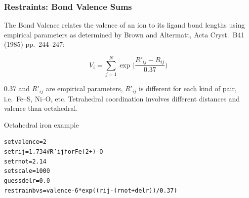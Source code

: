 \documentclass[10pt, xcolor=x11names, compress]{beamer}
\begin{document}
\begin{frame}[fragile]
  \frametitle{Restraints: Bond Valence Sums}

  The Bond Valence relates the valence of an ion to its ligand bond
  lengths using empirical parameters as determined by Brown and
  Altermatt, Acta Cryst.\ B41 (1985) pp.~244--247:

  \begin{equation}
    \label{eq:bvs}
    V_i = \sum\limits_{j=1}^N \exp\Big(\frac{R'_{ij} - R_{ij}}{0.37}\Big)
  \end{equation}

  0.37 and $R'_{ij}$ are empirical parameters, $R'_{ij}$ is
  different for each kind of pair, i.e.\ Fe--S, Ni--O, etc.
  Tetrahedral coordination involves different distances and valence
  than octahedral.

  \bigskip

  Octahedral iron example
  \begin{block}{}
    \begin{alltt}
    \scriptsize
     {\color{setp}set}      valence = 2
     {\color{setp}set}      rij     = 1.734  {\color{Blue4}# R'ij for Fe(2+)-O}
     {\color{setp}set}      rnot    = 2.14
     {\color{setp}set}      scale   = 1000
     {\color{guessp}guess}    delr    = 0.0
     {\color{restrainp}restrain} bvs     = valence - 6 * exp( (rij - (rnot+delr)) / 0.37 )
    \end{alltt}
  \end{block}

\end{frame}
\end{document}
